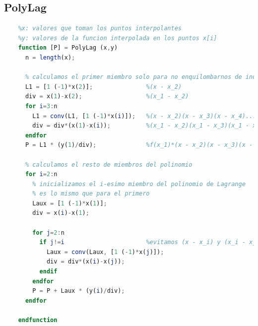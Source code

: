 \documentclass{article}
\begin{document}
    \subsection{PolyLag}
    \begin{lstlisting}[language=Octave]
    %P: vector de coeficientes del polinomio de Lagrange que interpola los puntos (x,y)
    %x: valores que toman los puntos interpolantes
    %y: valores de la funcion interpolada en los puntos x[i]
    function [P] = PolyLag (x,y)
      n = length(x);
    
      % calculamos el primer miembro solo para no enquilombarnos de indices despues
      L1 = [1 (-1)*x(2)];               %(x - x_2)
      div = x(1)-x(2);                  %(x_1 - x_2)
      for i=3:n
        L1 = conv(L1, [1 (-1)*x(i)]);   %(x - x_2)(x - x_3)(x - x_4)...(x - x_n)
        div = div*(x(1)-x(i));          %(x_1 - x_2)(x_1 - x_3)(x_1 - x_4)...(x_1 - x_n)
      endfor
      P = L1 * (y(1)/div);              %f(x_1)*(x - x_2)(x - x_3)(x - x_4)...(x - x_n) / (x_1 - x_2)(x_1 - x_3)(x_1 - x_4)...(x_1 - x_n)
    
      % calculamos el resto de miembros del polinomio
      for i=2:n
        % inicializamos el i-esimo miembro del polinomio de Lagrange
        % es lo mismo que para el primero
        Laux = [1 (-1)*x(1)];
        div = x(i)-x(1);
    
        for j=2:n
          if j!=i                       %evitamos (x - x_i) y (x_i - x_i)
            Laux = conv(Laux, [1 (-1)*x(j)]);
            div = div*(x(i)-x(j));
          endif
        endfor
        P = P + Laux * (y(i)/div);
      endfor
    
    endfunction
    \end{lstlisting}
\end{document}
